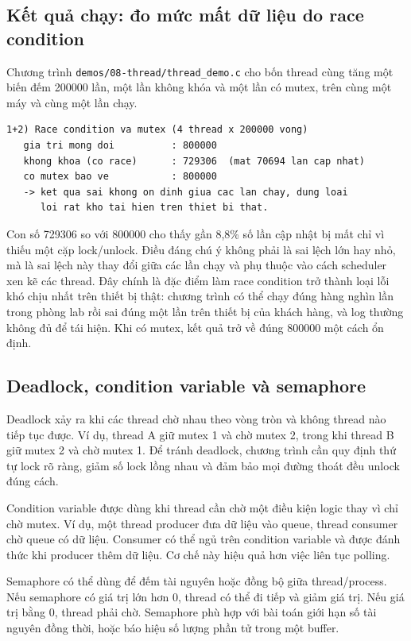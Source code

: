 \documentclass[11pt]{article}
\newcommand{\code}[1]{\texttt{#1}}
\begin{document}
\subsection{Kết quả chạy: đo mức mất dữ liệu do race condition}

Chương trình \code{demos/08-thread/thread\_demo.c} cho bốn thread cùng tăng một biến đếm 200000 lần, một lần không khóa và một lần có mutex, trên cùng một máy và cùng một lần chạy.

\begin{lstlisting}[caption={Race condition và tác dụng của mutex}]
1+2) Race condition va mutex (4 thread x 200000 vong)
   gia tri mong doi          : 800000
   khong khoa (co race)      : 729306  (mat 70694 lan cap nhat)
   co mutex bao ve           : 800000
   -> ket qua sai khong on dinh giua cac lan chay, dung loai
      loi rat kho tai hien tren thiet bi that.
\end{lstlisting}

Con số 729306 so với 800000 cho thấy gần 8,8\% số lần cập nhật bị mất chỉ vì thiếu một cặp lock/unlock. Điều đáng chú ý không phải là sai lệch lớn hay nhỏ, mà là sai lệch này thay đổi giữa các lần chạy và phụ thuộc vào cách scheduler xen kẽ các thread. Đây chính là đặc điểm làm race condition trở thành loại lỗi khó chịu nhất trên thiết bị thật: chương trình có thể chạy đúng hàng nghìn lần trong phòng lab rồi sai đúng một lần trên thiết bị của khách hàng, và log thường không đủ để tái hiện. Khi có mutex, kết quả trở về đúng 800000 một cách ổn định.

\subsection{Deadlock, condition variable và semaphore}

Deadlock xảy ra khi các thread chờ nhau theo vòng tròn và không thread nào tiếp tục được. Ví dụ, thread A giữ mutex 1 và chờ mutex 2, trong khi thread B giữ mutex 2 và chờ mutex 1. Để tránh deadlock, chương trình cần quy định thứ tự lock rõ ràng, giảm số lock lồng nhau và đảm bảo mọi đường thoát đều unlock đúng cách.

Condition variable được dùng khi thread cần chờ một điều kiện logic thay vì chỉ chờ mutex. Ví dụ, một thread producer đưa dữ liệu vào queue, thread consumer chờ queue có dữ liệu. Consumer có thể ngủ trên condition variable và được đánh thức khi producer thêm dữ liệu. Cơ chế này hiệu quả hơn việc liên tục polling.

Semaphore có thể dùng để đếm tài nguyên hoặc đồng bộ giữa thread/process. Nếu semaphore có giá trị lớn hơn 0, thread có thể đi tiếp và giảm giá trị. Nếu giá trị bằng 0, thread phải chờ. Semaphore phù hợp với bài toán giới hạn số tài nguyên đồng thời, hoặc báo hiệu số lượng phần tử trong một buffer.
\end{document}
